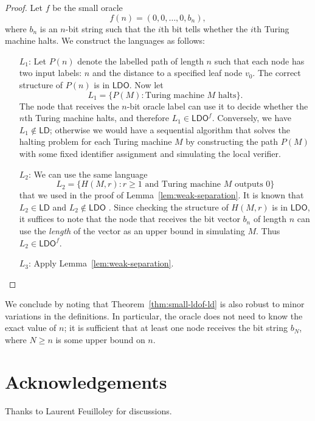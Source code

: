 \documentclass[11pt,a4paper]{article}
\theoremstyle{definition}
\theoremstyle{remark}
\newcommand{\ldo}{\mathsf{LDO}}
\newcommand{\ld}{\mathsf{LD}}
\begin{document}
\begin{proof}
    Let $f$ be the small oracle
    \[
        f(n) = (0,0,\dotsc,0,b_n),
    \]
    where $b_n$ is an $n$-bit string such that the $i$th bit tells whether the $i$th Turing machine halts. We construct the languages as follows:
    \begin{itemize}
        \item[$L_1$:]
            Let $P(n)$ denote the labelled path of length $n$ such that each node has two input labels: $n$ and the distance to a specified leaf node $v_0$. The correct structure of $P(n)$ is in $\ldo$. Now let
            \[
                L_1 = \{ P(M) : \text{Turing machine } M \text{ halts} \}. 
            \]
            The node that receives the $n$-bit oracle label can use it to decide whether the $n$th Turing machine halts, and therefore $L_1 \in \ldo^f$. Conversely, we have $L_1 \notin \ld$; otherwise we would have a sequential algorithm that solves the halting problem for each Turing machine $M$ by constructing the path $P(M)$ with some fixed identifier assignment and simulating the local verifier.
        \item[$L_2$:]
            We can use the same language
            \[
                L_2 = \{ H(M,r) : r \ge 1 \text{ and Turing machine } M \text{ outputs 0}\}
            \]
            that we used in the proof of Lemma~\ref{lem:weak-separation}. It is known that $L_2 \in \ld$ and $L_2 \notin \ldo$ \cite{fraigniaud13ld-id}. Since checking the structure of $H(M,r)$ is in $\ldo$, it suffices to note that the node that receives the bit vector $b_n$ of length $n$ can use the \emph{length} of the vector as an upper bound in simulating $M$. Thus $L_2 \in \ldo^f$.
        \item[$L_3$:]
            Apply Lemma~\ref{lem:weak-separation}. \qedhere
    \end{itemize}
\end{proof}

We conclude by noting that Theorem~\ref{thm:small-ldof-ld} is also robust to minor variations in the definitions. In particular, the oracle does not need to know the exact value of $n$; it is sufficient that at least one node receives the bit string $b_N$, where $N \ge n$ is some upper bound on $n$.

\section*{Acknowledgements}

Thanks to Laurent Feuilloley for discussions.



\end{document}
